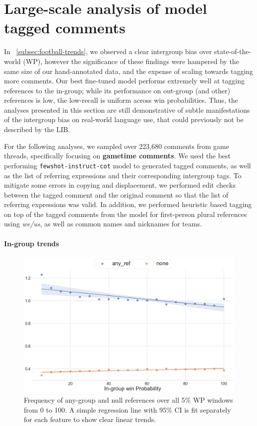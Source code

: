 \section{Large-scale analysis of model tagged comments}
\label{sec:football-analysis}

In \textsection~\ref{subsec:football-trends}, we observed a clear intergroup bias over state-of-the-world (WP), however the significance of these findings were hampered by the same size of our hand-annotated data, and the expense of scaling towards tagging more comments. Our best fine-tuned model performs extremely well at tagging references to the in-group; while its performance on out-group (and other) references is low, the low-recall is uniform across win probabilities. Thus, the analyses presented in this section are still demonstrative of subtle manifestations of the intergroup bias on real-world language use, that could previously not be described by the LIB.

For the following analyses, we sampled over 223,680 comments from game threads, specifically focusing on \textbf{gametime comments}. We used the best performing \texttt{fewshot-instruct-cot} model to generated tagged comments, as well as the list of referring expressions and their corresponding intergroup tags. To mitigate some errors in copying and displacement, we performed edit checks between the tagged comment and the original comment so that the list of referring expressions was valid. In addition, we performed heuristic based tagging on top of the tagged comments from the model for first-person plural references using \emph{we/us}, as well as common names and nicknames for teams.

\paragraph{In-group trends}

\begin{figure}[t]
    \centering
    \includegraphics[width=\linewidth]{figures/trends-1.png}
    \caption{Frequency of any-group and null references over all 5\% WP windows from 0 to 100. A simple regression line with 95\% CI is fit separately for each feature to show clear linear trends.}
    \label{fig:trends-1}
\end{figure}

